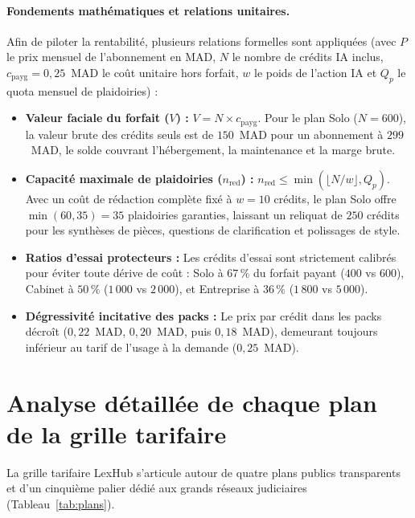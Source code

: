 \paragraph{Fondements mathématiques et relations unitaires.}
Afin de piloter la rentabilité, plusieurs relations formelles sont appliquées (avec $P$ le prix mensuel de l'abonnement en MAD, $N$ le nombre de crédits IA inclus, $c_{\mathrm{payg}}=0{,}25$~MAD le coût unitaire hors forfait, $w$ le poids de l'action IA et $Q_p$ le quota mensuel de plaidoiries) :
\begin{itemize}[leftmargin=*]
  \item \textbf{Valeur faciale du forfait ($V$) :} $V = N \times c_{\mathrm{payg}}$. Pour le plan Solo ($N=600$), la valeur brute des crédits seuls est de $150$~MAD pour un abonnement à $299$~MAD, le solde couvrant l'hébergement, la maintenance et la marge brute.
  \item \textbf{Capacité maximale de plaidoiries ($n_{\mathrm{red}}$) :} $n_{\mathrm{red}} \le \min(\lfloor N/w\rfloor, Q_p)$. Avec un coût de rédaction complète fixé à $w=10$ crédits, le plan Solo offre $\min(60, 35) = 35$ plaidoiries garanties, laissant un reliquat de $250$ crédits pour les synthèses de pièces, questions de clarification et polissages de style.
  \item \textbf{Ratios d'essai protecteurs :} Les crédits d'essai sont strictement calibrés pour éviter toute dérive de coût : Solo à $67\,\%$ du forfait payant ($400$ vs $600$), Cabinet à $50\,\%$ ($1\,000$ vs $2\,000$), et Entreprise à $36\,\%$ ($1\,800$ vs $5\,000$).
  \item \textbf{Dégressivité incitative des packs :} Le prix par crédit dans les packs décroît ($0{,}22$~MAD, $0{,}20$~MAD, puis $0{,}18$~MAD), demeurant toujours inférieur au tarif de l'usage à la demande ($0{,}25$~MAD).
\end{itemize}

\section{Analyse détaillée de chaque plan de la grille tarifaire}
\label{sec:details-plans}

La grille tarifaire LexHub s'articule autour de quatre plans publics transparents et d'un cinquième palier dédié aux grands réseaux judiciaires (Tableau~\ref{tab:plans}).

